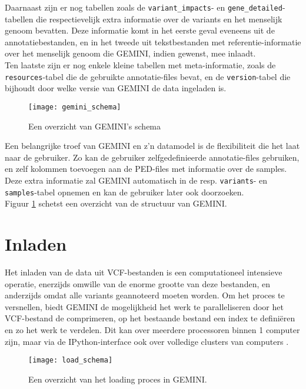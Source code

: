 Daarnaast zijn er nog tabellen zoals de \texttt{variant\_impacts}- en \texttt{gene\_detailed}-tabellen die respectievelijk extra informatie over de variants en het menselijk genoom bevatten. Deze informatie komt in het eerste geval eveneens uit de annotatiebestanden, en in het tweede uit tekstbestanden met referentie-informatie over het menselijk genoom die GEMINI, indien gewenst, mee inlaadt.\\
Ten laatste zijn er nog enkele kleine tabellen met meta-informatie, zoals de \texttt{resources}-tabel die de gebruikte annotatie-files bevat, en de \texttt{version}-tabel die bijhoudt door welke versie van GEMINI de data ingeladen is.\\

\begin{figure}[!h]
\texttt{[image: gemini\_schema]}
\caption{Een overzicht van GEMINI's schema \cite{10.1371/journal.pcbi.1003153}}
\label{gemini_schema_pic}
\end{figure}

Een belangrijke troef van GEMINI en z'n datamodel is de flexibiliteit die het laat naar de gebruiker. Zo kan de gebruiker zelfgedefinieerde annotatie-files gebruiken, en zelf kolommen toevoegen aan de PED-files met informatie over de samples. Deze extra informatie zal GEMINI automatisch in de resp. \texttt{variants}- en \texttt{samples}-tabel opnemen en kan de gebruiker later ook doorzoeken.\\

Figuur \ref{gemini_schema_pic} schetst een overzicht van de structuur van GEMINI.

\newpage
\section{Inladen}
\label{loading_origineel}
Het inladen van de data uit VCF-bestanden is een computationeel intensieve operatie, enerzijds omwille van de enorme grootte van deze bestanden, en anderzijds omdat alle variants geannoteerd moeten worden. Om het proces te versnellen, biedt GEMINI de mogelijkheid het werk te paralleliseren door het VCF-bestand de comprimeren, op het bestaande bestand een index te defini\"eren en zo het werk te verdelen. Dit kan over meerdere processoren binnen 1 computer zijn, maar via de IPython-interface ook over volledige clusters van computers \cite{PER-GRA:2007}.\\


\begin{figure}[!h]
\texttt{[image: load\_schema]}
\caption{Een overzicht van het loading proces in GEMINI.}
\label{load_schema}
\end{figure}

